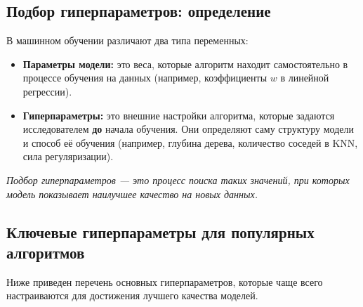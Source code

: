 \documentclass[12pt]{article}
\newcommand{\commentary}[1]{{\small\itshape\color{commentgray} #1}}
\begin{document}
\subsection{Подбор гиперпараметров: определение}
В машинном обучении различают два типа переменных:
\begin{itemize}
    \item \textbf{Параметры модели:} это веса, которые алгоритм находит самостоятельно в процессе обучения на данных (например, коэффициенты $w$ в линейной регрессии).
    \item \textbf{Гиперпараметры:} это внешние настройки алгоритма, которые задаются исследователем \textbf{до} начала обучения. Они определяют саму структуру модели и способ её обучения (например, глубина дерева, количество соседей в KNN, сила регуляризации).
\end{itemize}


\commentary{Подбор гиперпараметров — это процесс поиска таких значений, при которых модель показывает наилучшее качество на новых данных.}

\subsection{Ключевые гиперпараметры для популярных алгоритмов}

Ниже приведен перечень основных гиперпараметров, которые чаще всего настраиваются для достижения лучшего качества моделей.
\end{document}
